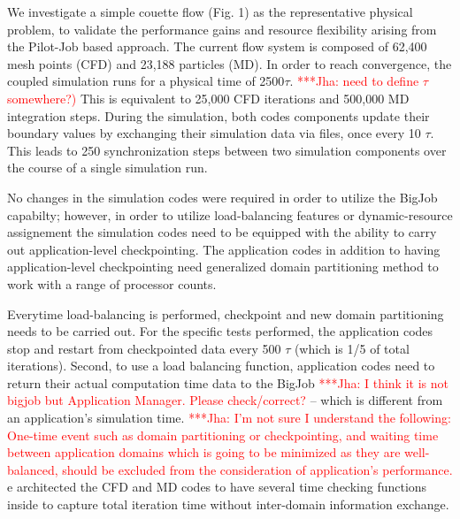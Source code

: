 \documentclass[conference,final]{IEEEtran}
\newcommand{\jhanote}[1]{ {\textcolor{red} { ***Jha: #1 }}}
\newcommand{\jhanote}[1]{}
\begin{document}
We investigate a simple couette flow (Fig. 1) as the representative
physical problem, to validate the performance gains and 
resource flexibility arising from the Pilot-Job based approach.
The current flow system is
composed of 62,400 mesh points (CFD) and 23,188 particles (MD).
In order to reach convergence, the coupled simulation runs for a
physical time of 2500$\tau$.  \jhanote{need to define $\tau$
  somewhere?)}  This is equivalent to 25,000 CFD iterations and
500,000 MD integration steps. During the simulation, both codes
components update their boundary values by exchanging their simulation
data via files, once every 10 $\tau$. This leads to 250
synchronization steps between two simulation components over
the course of a single simulation run.

No changes in the simulation codes were required in order
to utilize the BigJob capabilty; however, in order
to utilize load-balancing features or dynamic-resource
assignement the simulation codes need to be equipped
with the ability to carry out application-level checkpointing.
The application codes in addition to having application-level
checkpointing need generalized domain partitioning method to work
with a range of processor counts.



Everytime load-balancing is performed, checkpoint and new domain
partitioning needs to be carried out. For the specific tests
performed, the application codes stop and restart from checkpointed
data every 500 $\tau$ (which is 1/5 of total iterations). Second, to
use a load balancing function, application codes need to return their
actual computation time data to the BigJob \jhanote{I think it is not
  bigjob but Application Manager. Please check/correct?}  -- which is
different from an application's simulation time.  \jhanote{I'm not
  sure I understand the following: One-time event such as domain
  partitioning or checkpointing, and waiting time between application
  domains which is going to be minimized as they are well-balanced,
  should be excluded from the consideration of application's
  performance.}  e architected the CFD and MD codes to have several
time checking functions inside to capture total iteration time without
inter-domain information exchange.
\end{document}
